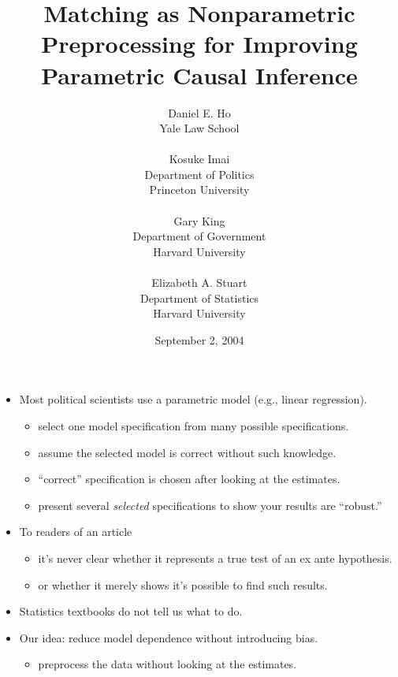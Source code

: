 \documentclass[20pt,landscape,pdftex]{foils}
\title{Matching as Nonparametric Preprocessing for Improving
  Parametric Causal Inference}
\date{September 2, 2004}
\author{Daniel E. Ho \\
  Yale Law School\\
  \\
  Kosuke Imai\\
  Department of Politics\\ Princeton University \\
  \\ 
  Gary King\\
  Department of Government\\ Harvard University\\
  \\
  Elizabeth A. Stuart\\
  Department of Statistics\\ Harvard University
\mbox{}\pdfbookmark{TitlePage}{stlab0}}
\begin{document}
\color{black}
\LOGOOFF
\maketitle



\hypersetup{pdfpagetransition=Replace}

\begin{itemize}
\item Most political scientists use a parametric model (e.g., linear
  regression).\pause
  \begin{itemize}
  \item select one model specification from many possible
    specifications.\pause
  \item assume the selected model is correct without such
    knowledge.\pause
  \item ``correct'' specification is chosen after looking at the
    estimates.\pause  
  \item present several {\it selected} specifications to show your
    results are ``robust.''\pause
  \end{itemize}

\item To readers of an article\pause 
  \begin{itemize}
  \item it's never clear whether it represents a true test of an ex
    ante hypothesis.\pause
  \item or whether it merely shows it's possible to find such
    results.\pause
  \end{itemize}
  
\item Statistics textbooks do not tell us what to do.\pause
  
\item Our idea: reduce model dependence without introducing
  bias.\pause
  \begin{itemize}
  \item preprocess the data without looking at the estimates.\pause
  \end{itemize} 
\end{itemize}
\end{document}
